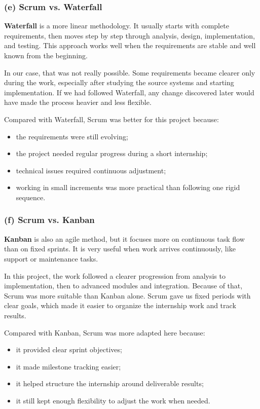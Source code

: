 \subsubsection{(e) Scrum vs. Waterfall}
\textbf{Waterfall} is a more linear methodology. It usually starts with complete requirements, then moves step by step through analysis, design, implementation, and testing. This approach works well when the requirements are stable and well known from the beginning.

In our case, that was not really possible. Some requirements became clearer only during the work, especially after studying the source systems and starting implementation. If we had followed Waterfall, any change discovered later would have made the process heavier and less flexible.

Compared with Waterfall, Scrum was better for this project because:
\begin{itemize}[noitemsep]
	\item the requirements were still evolving;
	\item the project needed regular progress during a short internship;
	\item technical issues required continuous adjustment;
	\item working in small increments was more practical than following one rigid sequence.
\end{itemize}

\subsubsection{(f) Scrum vs. Kanban}
\textbf{Kanban} is also an agile method, but it focuses more on continuous task flow than on fixed sprints. It is very useful when work arrives continuously, like support or maintenance tasks.

In this project, the work followed a clearer progression from analysis to implementation, then to advanced modules and integration. Because of that, Scrum was more suitable than Kanban alone. Scrum gave us fixed periods with clear goals, which made it easier to organize the internship work and track results.

Compared with Kanban, Scrum was more adapted here because:
\begin{itemize}[noitemsep]
	\item it provided clear sprint objectives;
	\item it made milestone tracking easier;
	\item it helped structure the internship around deliverable results;
	\item it still kept enough flexibility to adjust the work when needed.
\end{itemize}

